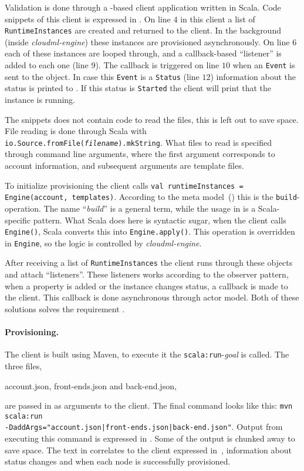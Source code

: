 Validation is done through a -based client application written in Scala.
Code snippets of this client is expressed in .
On line $4$ in this client a list of \texttt{RuntimeInstances} are created
and returned to the client.
In the background (inside \emph{cloudml-engine}) these instances are
provisioned asynchronously.
On line $6$ each of these instances are looped through, and a callback-based
``listener'' is added to each one (line $9$).
The callback is triggered on line $10$ when an \texttt{Event} is sent 
to the object.
In case this \texttt{Event} is a \texttt{Status} (line $12$) information
about the status is printed to .
If this status is \texttt{Started} the client will print that the instance is running.

The snippets does not contain code to read the files, this is left out to save space.
File reading is done through Scala with \texttt{io.Source.fromFile(\emph{filename}).mkString}.
What files to read is specified through command line arguments,
where the first argument corresponds to account information,
and subsequent arguments are template files.

To initialize provisioning the client calls 
\texttt{val runtimeInstances = Engine(account, templates)}.
According to the meta model~() this is the \texttt{build}-operation.
The name ``\emph{build}'' is a general term, while the usage in 
is a Scala-specific pattern.
What Scala does here is syntactic sugar, when the client calls \texttt{Engine()},
Scala converts this into \texttt{Engine.apply()}.
This operation is overridden in \texttt{Engine}, so the logic is controlled by \emph{cloudml-engine}.

After receiving a list of \texttt{RuntimeInstances} the client runs through these 
objects and attach ``listeners''.
These listeners works according to the observer pattern,
when a property is added or the instance changes status,
a callback is made to the client.
This callback is done asynchronous through actor model.
Both of these solutions solves the requirement .

\paragraph{Provisioning.}


The client is built using Maven, to execute it the \texttt{scala:run}-\emph{goal} is called.
The three files,
\begin{ii}
  \iitem account.json,
  \iitem front-ends.json and
  \iitem back-end.json,
\end{ii}
are passed in as arguments to the client.
The final command looks like this:
\texttt{mvn scala:run \\ -DaddArgs="account.json|front-ends.json|back-end.json"}.
Output from executing this command is expressed in .
Some of the output is chunked away to save space.
The text in  correlates to the 
client expressed in~,
\ie information about status changes and when each node is successfully provisioned.

